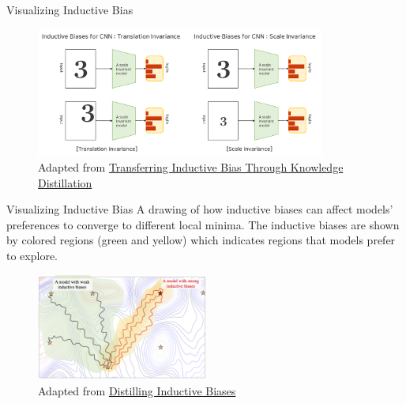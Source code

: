 \documentclass[serif, aspectratio=169]{beamer}
\begin{document}
\begin{frame}{Visualizing Inductive Bias}
\begin{figure}
        \centering
        \includegraphics[width=0.85\textwidth]{pic/inductive.png}
        \caption{Adapted from \href{https://velog.io/@euisuk-chung/Paper-Review-Transferring-Inductive-Bias-Through-Knowledge-Distillation-33}{Transferring Inductive Bias Through Knowledge Distillation}}
    \end{figure}
\end{frame}


\begin{frame}{Visualizing Inductive Bias}
A drawing of how inductive biases can affect models' preferences to converge to different local minima. The inductive biases are shown by colored regions (green and yellow) which indicates regions that models prefer to explore.
\begin{figure}
        \centering
        \includegraphics[width=0.5\textwidth]{pic/inductive_bias_distilation_example_1.png}
        \caption{Adapted from \href{https://samiraabnar.github.io/articles/2020-05/indist}{Distilling Inductive Biases}}
    \end{figure}
\end{frame}
\end{document}
